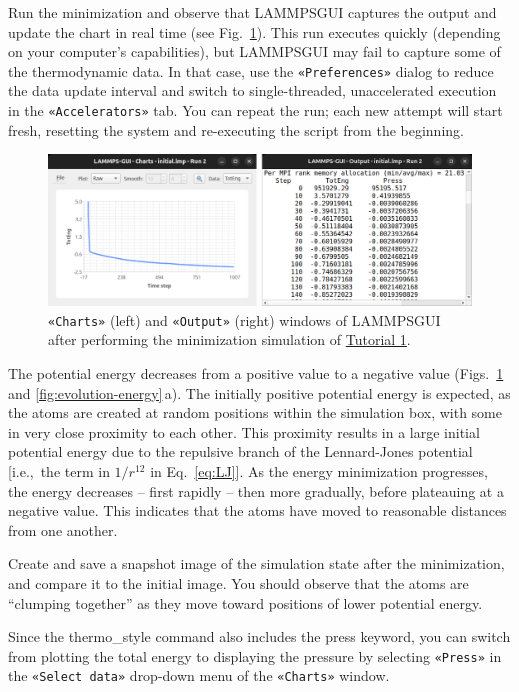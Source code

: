 \documentclass[9pt,tutorial]{livecoms}
\newcommand{\lmpcmd}[1]{\hspace{0pt}\colorbox{listing}{\textcolor{command}{\small{#1}}}\hspace{0pt}} %
\newcommand{\guicmd}[1]{\textcolor{command}{\texttt{«#1»}}} %
\newcommand{\lammpsgui}{\textsf{LAMMPS\textendash GUI}}
\begin{document}
Run the minimization and observe that \lammpsgui{} captures the output
and update the chart in real time (see Fig.~\ref{fig:chart-log}).  This run executes quickly (depending
on your computer's capabilities), but \lammpsgui{} may fail to capture some
of the thermodynamic data.  In that
case, use the \guicmd{Preferences} dialog to reduce the data update
interval and switch to single-threaded, unaccelerated execution in the
\guicmd{Accelerators} tab.  You can repeat the run; each new attempt will start
fresh, resetting the system and re-executing the script from the beginning.

\begin{figure}
\centering
\includegraphics[width=\linewidth]{chart-and-output.png}
\caption{\guicmd{Charts} (left) and \guicmd{Output} (right) windows of \lammpsgui{}
  after performing the minimization simulation of \hyperref[lennard-jones-label]{Tutorial 1}.}
\label{fig:chart-log}
\end{figure}

The potential energy decreases from a positive value to a
negative value (Figs.~\ref{fig:chart-log} and \ref{fig:evolution-energy}\,a).
The initially positive potential energy is
expected, as the atoms are created at random positions within
the simulation box, with some in very close proximity to each other.
This proximity results in a large initial potential energy due to the repulsive branch of the
Lennard-Jones potential [i.e.,~the term in $1/r^{12}$ in Eq.~\eqref{eq:LJ}].
As the energy minimization progresses, the
energy decreases -- first rapidly -- then more gradually,
before plateauing at a negative value.  This indicates that the atoms
have moved to reasonable distances from one another.

Create and save a snapshot image of the simulation state after the
minimization, and compare it to the initial image.  You should observe
that the atoms are ``clumping together'' as they move toward positions
of lower potential energy.

\begin{note}
Since the \lmpcmd{thermo\_style} command also includes the \lmpcmd{press}
keyword, you can switch from plotting the total energy to
displaying the pressure by selecting \guicmd{Press} in the \guicmd{Select data}
drop-down menu of the \guicmd{Charts} window.
\end{note}
\end{document}
